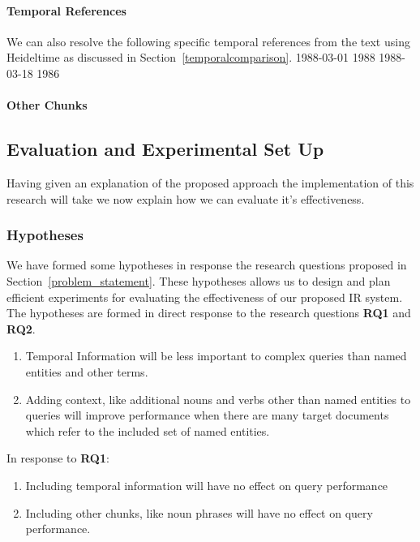 \documentclass{mprop}
\begin{document}
\paragraph{Temporal References}
We can also resolve the following specific temporal references from the text using Heideltime as discussed in Section~\ref{temporalcomparison}.
1988-03-01
1988
1988-03-18
1986

\paragraph{Other Chunks}

\subsection{Evaluation and Experimental Set Up}
Having given an explanation of the proposed approach the implementation of this research will take we now explain how we can evaluate it's effectiveness.

\subsubsection{Hypotheses}
We have formed some hypotheses in response the research questions proposed in Section~\ref{problem_statement}. 
These hypotheses allows us to design and plan efficient experiments for evaluating the effectiveness of our proposed IR system. 
The hypotheses are formed in direct response to the research questions \textbf{RQ1} and \textbf{RQ2}.

\begin{enumerate}[label=\textbf{Hyp.\arabic*}]
\item Temporal Information will be less important to complex queries than named entities and other terms.
\item Adding context, like additional nouns and verbs other than named entities to queries will improve performance when there are many target documents which refer to the included set of named entities.
\end{enumerate}

In response to \textbf{RQ1}:

\begin{enumerate}[label=\textbf{Null Hyp.\arabic*}]
\item Including temporal information will have no effect on query performance
\item Including other chunks, like noun phrases will have no effect on query performance.
\setcounter{nullhyp}{\value{enumi}}
\end{enumerate}
\end{document}
